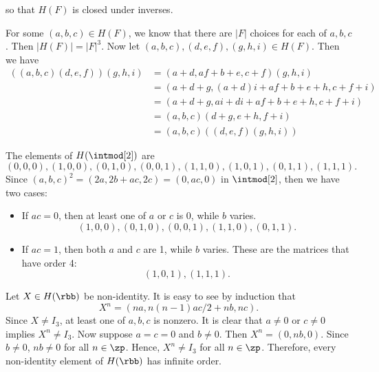 \begin{solenum}
    so that $H(F)$ is closed under inverses.
    \item For some $(a, b, c) \in H(F)$, we know that there are $|F|$ choices for each of $a, b, c$.
	Then $|H(F)| = |F|^3$.
	Now let $(a, b, c), (d, e, f), (g, h, i) \in H(F)$.
	Then we have
    \begin{align*}
        ((a, b, c)(d, e, f))(g, h, i) & = (a + d, af + b + e, c + f)(g, h, i) \\
        & = (a + d + g, (a + d)i + af + b + e + h, c + f + i) \\
        & = (a + d + g, ai + di + af + b + e + h, c + f + i) \\
        & = (a, b, c)(d + g, e + h, f + i) \\
        & = (a, b, c)((d, e, f)(g, h, i))
    \end{align*}
    \item The elements of $H(\intmod[2])$ are
    \[
    	 (0, 0, 0), (1, 0, 0), (0, 1, 0), (0, 0, 1), (1, 1, 0), (1, 0, 1), (0, 1, 1), (1, 1, 1).
    \]
    Since $(a, b, c)^2 = (2a, 2b + ac, 2c) = (0, ac, 0)$ in $\intmod[2]$, then we have two cases:
    \begin{itemize}
        \item If $ac = 0$, then at least one of $a$ or $c$ is 0, while $b$ varies.
        \[
        	(1, 0, 0), (0, 1, 0), (0, 0, 1), (1, 1, 0), (0, 1, 1).
        \]
        \item If $ac = 1$, then both $a$ and $c$ are 1, while $b$ varies.
	    These are the matrices that have order 4:
        \[
        	(1, 0, 1), (1, 1, 1).
        \]
    \end{itemize}
    \item Let $X \in H(\rbb)$ be non-identity.
	It is easy to see by induction that
    \[
    	X^n = (na, n(n - 1)ac/2 + nb, nc).
    \]
    Since $X \neq I_3$, at least one of $a, b, c$ is nonzero.
	It is clear that $a \neq 0$ or $c \neq 0$ implies $X^n \neq I_3$.
	Now suppose $a = c = 0$ and $b \neq 0$.
	Then $X^n = (0, nb, 0)$.
	Since $b \neq 0$, $nb \neq 0$ for all $n \in \zp$.
	Hence, $X^n \neq I_3$ for all $n \in \zp$.
	Therefore, every non-identity element of $H(\rbb)$ has infinite order.
\end{solenum}
